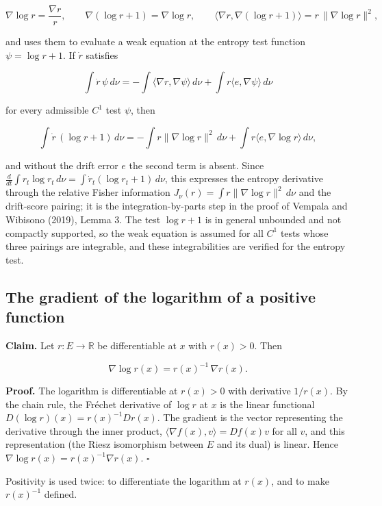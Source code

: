 \documentclass[11pt,a4paper]{report}
\begin{document}
\[\nabla\log r=\frac{\nabla r}{r},\qquad\nabla(\log r+1)=\nabla\log r,\qquad\bigl\langle\nabla r,\nabla(\log r+1)\bigr\rangle=r\,\|\nabla\log r\|^2,\]


and uses them to evaluate a weak equation at the entropy test function \(\psi=\log r+1\). If \(\dot r\) satisfies


\[\int\dot r\,\psi\,d\nu=-\int\langle\nabla r,\nabla\psi\rangle\,d\nu+\int r\langle e,\nabla\psi\rangle\,d\nu\]


for every admissible \(C^1\) test \(\psi\), then


\[\int\dot r\,(\log r+1)\,d\nu=-\int r\|\nabla\log r\|^2\,d\nu+\int r\langle e,\nabla\log r\rangle\,d\nu,\]


and without the drift error \(e\) the second term is absent. Since \(\frac{d}{dt}\int r_t\log r_t\,d\nu=\int\dot r_t(\log r_t+1)\,d\nu\), this expresses the entropy derivative through the relative Fisher information \(J_\nu(r)=\int r\|\nabla\log r\|^2\,d\nu\) and the drift-score pairing; it is the integration-by-parts step in the proof of Vempala and Wibisono (2019), Lemma 3. The test \(\log r+1\) is in general unbounded and not compactly supported, so the weak equation is assumed for all \(C^1\) tests whose three pairings are integrable, and these integrabilities are verified for the entropy test.

\subsection{\texorpdfstring{The gradient of the logarithm of a positive function}{The gradient of the logarithm of a positive function}}
\label{report-step-UnadjustedLangevin-LSI-ScoreCalculus-lean-1}


\textbf{Claim.} Let \(r:E\to\mathbb R\) be differentiable at \(x\) with \(r(x)>0\). Then


\[\nabla\log r(x)=r(x)^{-1}\,\nabla r(x).\]


\textbf{Proof.} The logarithm is differentiable at \(r(x)>0\) with derivative \(1/r(x)\). By the chain rule, the Fréchet derivative of \(\log r\) at \(x\) is the linear functional \(D(\log r)(x)=r(x)^{-1}Dr(x)\). The gradient is the vector representing the derivative through the inner product, \(\langle\nabla f(x),v\rangle=Df(x)v\) for all \(v\), and this representation (the Riesz isomorphism between \(E\) and its dual) is linear. Hence \(\nabla\log r(x)=r(x)^{-1}\nabla r(x)\). \(\square\)




Positivity is used twice: to differentiate the logarithm at \(r(x)\), and to make \(r(x)^{-1}\) defined.
\end{document}
